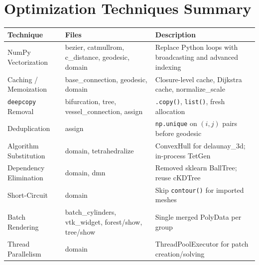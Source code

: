 \documentclass[11pt,a4paper]{article}
\begin{document}
\section{Optimization Techniques Summary}

\begin{longtable}{p{3.5cm}p{3.5cm}p{5cm}}
\toprule
\textbf{Technique} & \textbf{Files} & \textbf{Description} \\
\midrule
\endhead
NumPy Vectorization & bezier, catmullrom, c\_distance, geodesic, domain & Replace Python loops with broadcasting and advanced indexing \\
\midrule
Caching / Memoization & base\_connection, geodesic, domain & Closure-level cache, Dijkstra cache, normalize\_scale \\
\midrule
\texttt{deepcopy} Removal & bifurcation, tree, vessel\_connection, assign & \texttt{.copy()}, \texttt{list()}, fresh allocation \\
\midrule
Deduplication & assign & \texttt{np.unique} on $(i,j)$ pairs before geodesic \\
\midrule
Algorithm Substitution & domain, tetrahedralize & ConvexHull for delaunay\_3d; in-process TetGen \\
\midrule
Dependency Elimination & domain, dmn & Removed sklearn BallTree; reuse cKDTree \\
\midrule
Short-Circuit & domain & Skip \texttt{contour()} for imported meshes \\
\midrule
Batch Rendering & batch\_cylinders, vtk\_widget, forest/show, tree/show & Single merged PolyData per group \\
\midrule
Thread Parallelism & domain & ThreadPoolExecutor for patch creation/solving \\
\bottomrule
\end{longtable}
\end{document}
